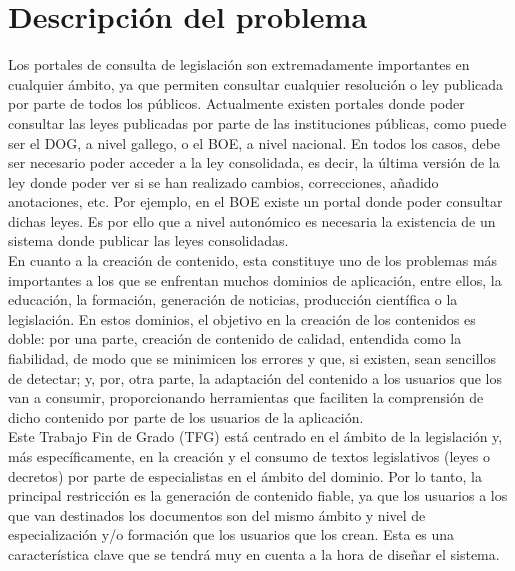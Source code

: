 \section{Descripción del problema}

Los portales de consulta de legislación son extremadamente importantes en cualquier ámbito, ya que permiten consultar cualquier resolución o ley publicada por parte de todos los públicos. Actualmente existen portales donde poder consultar las leyes publicadas por parte de las instituciones públicas, como puede ser el DOG, a nivel gallego, o el BOE, a nivel nacional. En todos los casos, debe ser necesario poder acceder a la ley consolidada, es decir, la última versión de la ley donde poder ver si se han realizado cambios, correcciones, añadido anotaciones, etc. Por ejemplo, en el BOE existe un portal \cite{boe} donde poder consultar dichas leyes. Es por ello que a nivel autonómico es necesaria la existencia de un sistema donde publicar las leyes consolidadas.
\\

En cuanto a la creación de contenido, esta constituye uno de los problemas más importantes a los que se enfrentan muchos dominios de aplicación, entre ellos, la educación, la formación, generación de noticias, producción científica o la legislación. En estos dominios, el objetivo en la creación de los contenidos es doble: por una parte, creación de contenido de calidad, entendida como la fiabilidad, de modo que se minimicen los errores y que, si existen, sean sencillos de detectar; y, por, otra parte, la adaptación del contenido a los usuarios que los van a consumir, proporcionando herramientas que faciliten la comprensión de dicho contenido por parte de los usuarios de la aplicación.
\\

Este Trabajo Fin de Grado (TFG) está centrado en el ámbito de la legislación y, más específicamente, en la creación y el consumo de textos legislativos (leyes o decretos) por parte de especialistas en el ámbito del dominio. Por lo tanto, la principal restricción es la generación de contenido fiable, ya que los usuarios a los que van destinados los documentos son del mismo ámbito y nivel de especialización y/o formación que los usuarios que los crean. Esta es una característica clave que se tendrá muy en cuenta a la hora de diseñar el sistema.
\\

